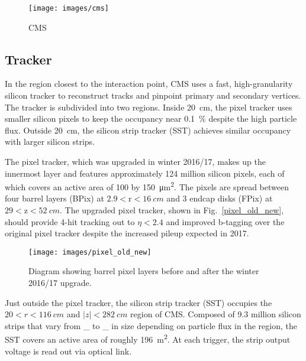 \documentclass[12pt]{article}
\begin{document}
        \noindent \begin{figure}[htbp] \begin{center}
        \texttt{[image: images/cms]}
            \caption{CMS}
        \label{cms}
        \end{center} \end{figure}

    \subsection{Tracker}
        In the region closest to the interaction point, CMS uses a fast, high-granularity silicon tracker to reconstruct tracks and pinpoint primary and secondary vertices. The tracker is subdivided into two regions. Inside \SI{20}{cm}, the pixel tracker  uses smaller silicon pixels to keep the occupancy near \SI{0.1}{\percent} despite the high particle flux. Outside \SI{20}{\cm}, the silicon strip tracker (SST) achieves similar occupancy with larger silicon strips.  

        The pixel tracker, which was upgraded in winter 2016/17, makes up the innermost layer and features approximately \num{124} million silicon pixels, each of which covers an active area of \num{100} by \SI{150}{\micro\meter^2}. The pixels are spread between four barrel layers (BPix) at $\num{2.9}<\mathrm{r}<\SI{16}{cm}$ and 3 endcap disks (FPix) at $\num{29} < \mathrm{z} < \SI{52}{cm}$. The upgraded pixel tracker, shown in Fig.~\ref{pixel_old_new}, should provide 4-hit tracking out to $\eta < \num{2.4}$ and improved b-tagging over the original pixel tracker despite the increased pileup expected in 2017.

        \noindent \begin{figure}[htbp] \begin{center}
            \texttt{[image: images/pixel\_old\_new]}
            \caption{Diagram showing barrel pixel layers before and after the winter 2016/17 upgrade.}
            \label{cms}
        \end{center} \end{figure}
        
        Just outside the pixel tracker, the silicon strip tracker (SST) occupies the $\num{20} < r < \SI{116}{cm}$ and $\lvert z \rvert < \SI{282}{cm}$ region of CMS. Composed of \num{9.3} million silicon strips that vary from \_ to \_ in size  depending on particle flux in the region, the SST covers an active area of roughly \SI{196}{m^2}. At each trigger, the strip output voltage is read out via optical link.
\end{document}
